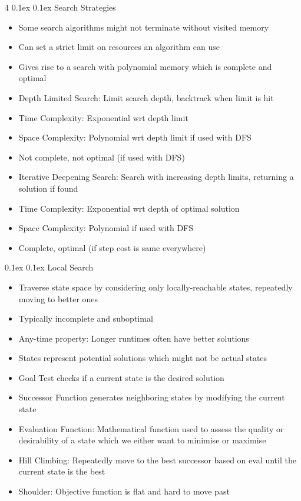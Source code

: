 \documentclass[10pt, landscape]{article}
\makeatletter
\renewcommand{\subsection}{\@startsection{subsection}{2}{0mm}%
  {0.1ex} %
  {0.1ex} %
  {\normalfont\normalsize\bfseries}}
\makeatother
\begin{document}
\begin{multicols*}{4}
\subsection{Search Strategies}
\begin{itemize}
    \item Some search algorithms might not terminate without visited memory
    \item Can set a strict limit on resources an algorithm can use
    \item Gives rise to a search with polynomial memory which is complete and optimal
    \item Depth Limited Search: Limit search depth, backtrack when limit is hit
    \item Time Complexity: Exponential wrt depth limit
    \item Space Complexity: Polynomial wrt depth limit if used with DFS
    \item Not complete, not optimal (if used with DFS)
    \item Iterative Deepening Search: Search with increasing depth limits, returning a solution if found
    \item Time Complexity: Exponential wrt depth of optimal solution
    \item Space Complexity: Polynomial if used with DFS
    \item Complete, optimal (if step cost is same everywhere)
\end{itemize}

\subsection{Local Search}
\begin{itemize}
    \item Traverse state space by considering only locally-reachable states, repeatedly moving to better ones
    \item Typically incomplete and suboptimal
    \item Any-time property: Longer runtimes often have better solutions
    \item States represent potential solutions which might not be actual states
    \item Goal Test checks if a current state is the desired solution
    \item Successor Function generates neighboring states by modifying the current state
    \item Evaluation Function: Mathematical function used to assess the quality or desirability of a state which we either want to minimise or maximise
    \item Hill Climbing: Repeatedly move to the best successor based on eval until the current state is the best
    \item Shoulder: Objective function is flat and hard to move past
\end{itemize}


\end{multicols*}
\end{document}
